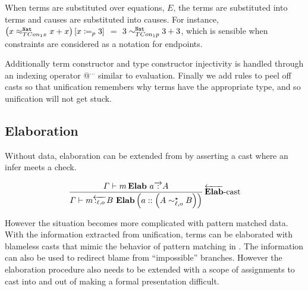 When terms are substituted over equations, $E$, the terms are substituted into terms and causes are substituted into causes.
For instance, 
  $\left(x \approx_{TCon_{1}x}^{\mathtt{Nat}{}}x+x\right) \left[x\coloneqq_{p} 3\right]$ $=$ $3 \sim_{TCon_{1}p}^{\mathtt{Nat}{}}3+3$,
  which is sensible when constraints are considered as a notation for endpoints.

Additionally term constructor and type constructor injectivity is handled through an indexing operator $@^{...}$ similar to evaluation.
Finally we add rules to peel off casts so that unification remembers why terms have the appropriate type, and so unification will not get stuck.

\subsection{Elaboration}
Without data, elaboration can be extended from  by asserting a cast where an infer meets a check.

\[
\frac{\varGamma\vdash m\,\textbf{Elab}\ a\overrightarrow{\,:\,}A}{\varGamma\vdash m\overleftarrow{\,:_{\ell,o}\,}B\ \textbf{Elab}\left(a::\left(A\sim_{\ell,o}^{\star}B\right)\right)}
\rulename{\overleftarrow{\textbf{Elab}}-cast}
\]

However the situation becomes more complicated with pattern matched data.
With the information extracted from unification, terms can be elaborated with blameless casts that mimic the behavior of pattern matching in .
The information can also be used to redirect blame from ``impossible'' branches.
However the elaboration procedure also needs to be extended with a scope of assignments to cast into and out of making a formal presentation difficult.